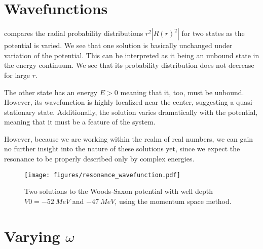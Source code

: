 \section{Wavefunctions}

 compares the radial probability distributions $r^2|R(r)^2|$ for two states as the potential is varied. We see that one solution is basically unchanged under variation of the potential. This can be interpreted as it being an unbound state in the energy continuum. We see that its probability distribution does not decrease for large $r$.

The other state has an energy $E>0$ meaning that it, too, must be unbound. However, its wavefunction is highly localized near the center, suggesting a quasi-stationary state. Additionally, the solution varies dramatically with the potential, meaning that it must be a feature of the system. 

However, because we are working within the realm of real numbers, we can gain no further insight into the nature of these solutions yet, since we expect the resonance to be properly described only by complex energies. 


\begin{figure}[H]
  \centering
  \texttt{[image: figures/resonance\_wavefunction.pdf]}
  \caption{Two solutions to the Woods-Saxon potential with well depth $V0=\SI{-52}{MeV}$ and $\SI{-47}{MeV}$, using the momentum space method.}
  \label{fig:resonance wavefunction}
\end{figure}

\section{Varying $\omega$}
